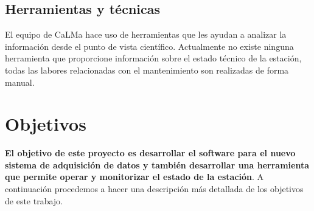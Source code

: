 	\subsection{Herramientas y técnicas}
		El equipo de CaLMa hace uso de herramientas que les ayudan a analizar la información desde el punto de vista científico. Actualmente
		no existe ninguna herramienta que proporcione información sobre el estado técnico de la estación, todas las labores relacionadas con
		el mantenimiento son realizadas de forma manual.

\section{Objetivos}
	\textbf{El objetivo de este proyecto es desarrollar el software para el nuevo sistema de adquisición de datos y también desarrollar una
	herramienta que permite operar y monitorizar el estado de la estación}. A continuación procedemos a hacer una descripción más detallada de los
	objetivos de este trabajo.  
